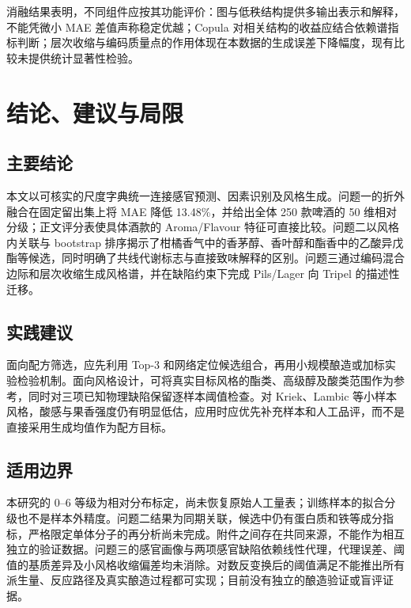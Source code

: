 \documentclass[
  chinese,
  11pt,
]{article}
\begin{document}
消融结果表明，不同组件应按其功能评价：图与低秩结构提供多输出表示和解释，不能凭微小
MAE 差值声称稳定优越；Copula
对相关结构的收益应结合依赖谱指标判断；层次收缩与编码质量点的作用体现在本数据的生成误差下降幅度，现有比较未提供统计显著性检验。

\section{结论、建议与局限}\label{ux7ed3ux8bbaux5efaux8baeux4e0eux5c40ux9650}

\subsection{主要结论}\label{ux4e3bux8981ux7ed3ux8bba}

本文以可核实的尺度字典统一连接感官预测、因素识别及风格生成。问题一的折外融合在固定留出集上将
MAE 降低 13.48\%，并给出全体 250 款啤酒的 50
维相对分级；正文评分表使具体酒款的 Aroma/Flavour
特征可直接比较。问题二以风格内关联与 bootstrap
排序揭示了柑橘香气中的香茅醇、香叶醇和酯香中的乙酸异戊酯等候选，同时明确了共线代谢标志与直接致味解释的区别。问题三通过编码混合边际和层次收缩生成风格谱，并在缺陷约束下完成
Pils/Lager 向 Tripel 的描述性迁移。

\subsection{实践建议}\label{ux5b9eux8df5ux5efaux8bae}

面向配方筛选，应先利用 Top-3
和网络定位候选组合，再用小规模酿造或加标实验检验机制。面向风格设计，可将真实目标风格的酯类、高级醇及酸类范围作为参考，同时对三项已知物理缺陷保留逐样本阈值检查。对
Kriek、Lambic
等小样本风格，酸感与果香强度仍有明显低估，应用时应优先补充样本和人工品评，而不是直接采用生成均值作为配方目标。

\subsection{适用边界}\label{ux9002ux7528ux8fb9ux754c}

本研究的 0--6
等级为相对分布标定，尚未恢复原始人工量表；训练样本的拟合分级也不是样本外精度。问题二结果为同期关联，候选中仍有蛋白质和铁等成分指标，严格限定单体分子的再分析尚未完成。附件之间存在共同来源，不能作为相互独立的验证数据。问题三的感官画像与两项感官缺陷依赖线性代理，代理误差、阈值的基质差异及小风格收缩偏差均未消除。对数反变换后的阈值满足不能推出所有派生量、反应路径及真实酿造过程都可实现；目前没有独立的酿造验证或盲评证据。
\end{document}
